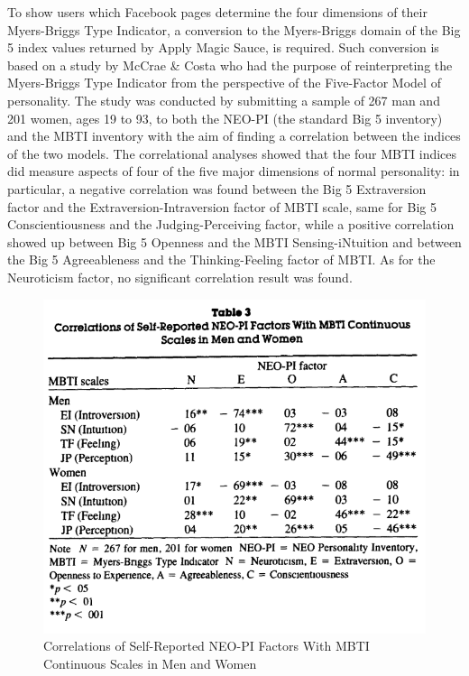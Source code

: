 \documentclass[b5paper,10pt,twoside,cucitura]{toptesi}
\begin{document}
To show users which Facebook pages determine the four dimensions of their Myers-Briggs Type Indicator, a conversion to the Myers-Briggs domain of the Big 5 index values returned by Apply Magic Sauce, is required. Such conversion is based on a study   \citep{big5-mbti} by McCrae \& Costa who had the purpose of reinterpreting the Myers-Briggs Type Indicator from the perspective of the Five-Factor Model of personality. The study was conducted by submitting a sample of 267 man and 201 women, ages 19 to 93, to both the NEO-PI (the standard Big 5 inventory) and the MBTI inventory with the aim of finding a correlation between the indices of the two models. The correlational analyses showed that the four MBTI indices did measure aspects of four of the five major dimensions of normal personality: in particular, a negative correlation was found between the Big 5 Extraversion factor and the Extraversion-Intraversion factor of MBTI scale, same for Big 5 Conscientiousness and the Judging-Perceiving factor, while a positive correlation showed up between Big 5 Openness and the MBTI Sensing-iNtuition and between the Big 5 Agreeableness and the Thinking-Feeling factor of MBTI. As for the Neuroticism factor, no significant correlation result was found.

\begin{figure}[ht]
\centering
\includegraphics[scale=0.68]{big5-mbti.png}
\caption{Correlations of Self-Reported NEO-PI Factors With MBTI Continuous Scales in Men and Women}
\end{figure}
\end{document}
